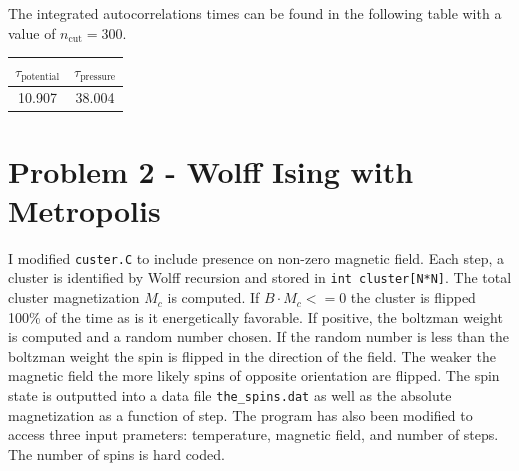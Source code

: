 \documentclass[singlepage,notitlepage,nofootinbib,11pt]{revtex4-1}
\begin{document}
The integrated autocorrelations times can be found in the following table with a value of $n_{\text{cut}} = 300$.
  \begin{center}
    \begin{tabular}{| c | c |}\hline
      $\tau_{\text{potential}}$ & $\tau_{\text{pressure}}$ \\ \hline
        10.907 & 38.004\\ \hline
    \end{tabular}
  \end{center}
\clearpage
\section{Problem 2 - Wolff Ising with Metropolis}
I modified \verb|custer.C| to include presence on non-zero magnetic field. Each step, a cluster is identified by Wolff recursion and stored in \verb|int cluster[N*N]|. The total cluster magnetization $M_c$ is computed. If $B\cdot M_c <= 0$ the cluster is flipped 100\% of the time as is it energetically favorable. If positive, the boltzman weight is computed and a random number chosen. If the random number is less than the boltzman weight the spin is flipped in the direction of the field. The weaker the magnetic field the more likely spins of opposite orientation are flipped. The spin state is outputted into a data file \verb|the_spins.dat| as well as the absolute magnetization as a function of step. The program has also been modified to access three input prameters: temperature, magnetic field, and number of steps. The number of spins is hard coded. 
\end{document}
